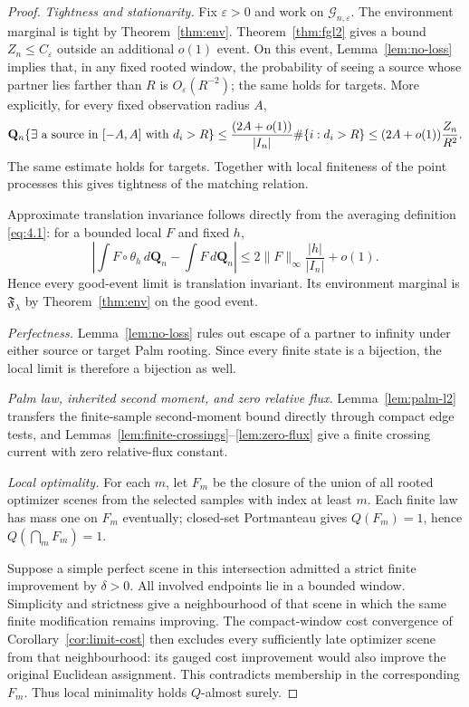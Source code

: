 \documentclass[11pt,reqno]{amsart}
\theoremstyle{definition}
\theoremstyle{remark}
\numberwithin{equation}{section}
\newcommand{\cF}{\mathfrak F}
\begin{document}
\begin{proof}
\emph{Tightness and stationarity.}
Fix \(\varepsilon>0\) and work on
\(\mathcal G_{n,\varepsilon}\).  The environment marginal is tight by
Theorem~\ref{thm:env}.  Theorem~\ref{thm:fgl2} gives a bound
\(Z_n\le C_\varepsilon\) outside an additional \(o(1)\) event.  On this
event, Lemma~\ref{lem:no-loss} implies that, in any fixed rooted window,
the probability of seeing a source whose partner lies farther than
\(R\) is \(O_{\varepsilon}(R^{-2})\); the same holds for targets.
More explicitly, for every fixed observation radius \(A\),
\[
\mathbf Q_n\{\exists\hbox{ a source in }[-A,A]\hbox{ with }d_i>R\}
\le
\frac{(2A+o(1))}{|I_n|}\#\{i:d_i>R\}
\le
(2A+o(1))\frac{Z_n}{R^2}.
\]
The same estimate holds for targets.  Together with local finiteness of
the point processes this gives tightness of the matching relation.

Approximate translation invariance
follows directly from the averaging definition \eqref{eq:4.1}:
for a bounded local \(F\) and fixed \(h\),
\[
\left|\int F\circ\theta_h\,d\mathbf Q_n-\int F\,d\mathbf Q_n\right|
\le
2\|F\|_\infty\frac{|h|}{|I_n|}+o(1).
\]
Hence every good-event limit is translation invariant.  Its
environment marginal is \(\cF_\lambda\) by Theorem~\ref{thm:env} on the good event.

\emph{Perfectness.}
Lemma~\ref{lem:no-loss} rules out escape of a partner to infinity under
either source or target Palm rooting.  Since every finite state is a
bijection, the local limit is therefore a bijection as well.

\emph{Palm law, inherited second moment, and zero relative flux.}
Lemma~\ref{lem:palm-l2} transfers the finite-sample second-moment bound directly
through compact edge tests,
and Lemmas~\ref{lem:finite-crossings}--\ref{lem:zero-flux} give a finite
crossing current with zero relative-flux constant.

\emph{Local optimality.}
For each \(m\), let \(F_m\) be the closure of the union of all
rooted optimizer scenes from the selected samples with index at least
\(m\).  Each finite law has mass one on \(F_m\) eventually; closed-set
Portmanteau gives \(Q(F_m)=1\), hence \(Q(\bigcap_mF_m)=1\).

Suppose a simple perfect scene in this intersection admitted a strict
finite improvement by \(\delta>0\).  All involved endpoints lie in
a bounded window.  Simplicity and strictness give a neighbourhood of
that scene in which the same finite modification remains improving.
The compact-window cost convergence of Corollary~\ref{cor:limit-cost}
then excludes every sufficiently late optimizer scene from
that neighbourhood: its gauged cost improvement would also improve
the original Euclidean assignment.  This contradicts membership in
the corresponding \(F_m\).  Thus local minimality holds \(Q\)-almost
surely.


\end{proof}
\end{document}
